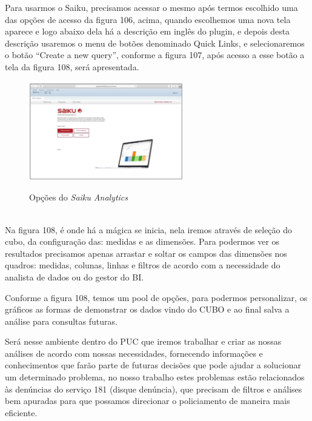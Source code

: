 Para usarmos o Saiku, precisamos acessar o mesmo ap\'{o}s termos escolhido uma das op\c{c}\~{o}es de acesso da figura 106, acima, 
quando escolhemos uma nova tela aparece e logo abaixo dela h\'{a} a descri\c{c}\~{a}o em inglês do plugin, e depois desta descri\c{c}\~{a}o
usaremos o menu de bot\~{o}es denominado Quick Links, e selecionaremos o bot\~{a}o ``Create a new query'', conforme a figura 107,  ap\'{o}s 
acesso a esse bot\~{a}o a tela da figura 108, ser\'{a} apresentada.

\begin{figure}[H]
	\vspace*{0,2cm}
    \centering
    \caption{Op\c{c}\~{o}es do \textit{Saiku Analytics}}
    \includegraphics[width=0.6\textwidth]{./04-figuras/figura-puc-saiku-opcoes}
    \label{fig:ilustfigpucsaikuopcoes}
\end{figure}
\vspace*{-0,9cm}
{\raggedright {}} \\

Na figura 108, \'{e} onde h\'{a} a m\'{a}gica se inicia, nela iremos atrav\'{e}s de sele\c{c}\~{a}o do cubo, da configura\c{c}\~{a}o das: medidas e as dimens\~{o}es. 
Para podermos ver os resultados precisamos apenas arrastar e soltar os campos das dimens\~{o}es nos quadros: medidas, colunas, linhas e filtros de acordo com a necessidade 
do analista de dados ou do gestor do BI.

Conforme a figura 108, temos um pool de op\c{c}\~{o}es, para podermos personalizar, os gr\'{a}ficos as formas de demonstrar os dados vindo do CUBO e ao final 
salva a an\'{a}lise para consultas futuras.   

Ser\'{a} nesse ambiente dentro do PUC que iremos trabalhar e criar as nossas an\'{a}lises de acordo com nossas necessidades, fornecendo informa\c{c}\~{o}es e 
conhecimentos que far\~{a}o parte de futuras decis\~{o}es que pode ajudar a solucionar um determinado problema, no nosso trabalho estes problemas est\~{a}o 
relacionados às denúncias do servi\c{c}o 181 (disque denúncia), que precisam de filtros e an\'{a}lises bem apuradas para que possamos direcionar o policiamento de maneira mais eficiente.

